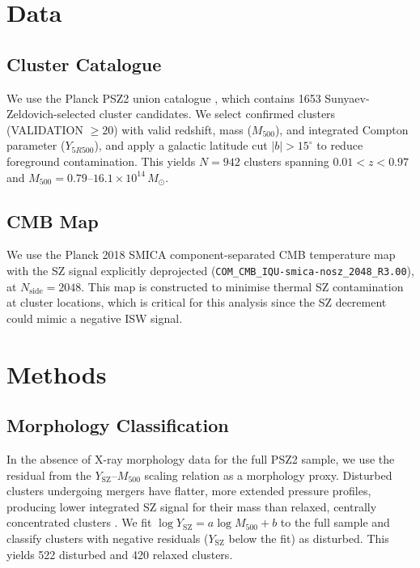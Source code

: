 \documentclass[twocolumn]{article}
\begin{document}
\section{Data}
\label{sec:data}

\subsection{Cluster Catalogue}

We use the Planck PSZ2 union catalogue
\citep{planckpsz2}, which contains 1653 Sunyaev-Zeldovich-selected
cluster candidates.
We select confirmed clusters (VALIDATION $\geq 20$) with valid
redshift, mass ($M_{500}$), and integrated Compton parameter
($Y_{5R500}$), and apply a galactic latitude cut $|b| > 15^\circ$
to reduce foreground contamination.
This yields $N = 942$ clusters spanning $0.01 < z < 0.97$ and
$M_{500} = 0.79$--$16.1 \times 10^{14}\,M_\odot$.

\subsection{CMB Map}

We use the Planck 2018 SMICA component-separated CMB temperature
map with the SZ signal explicitly deprojected
(\texttt{COM\_CMB\_IQU-smica-nosz\_2048\_R3.00}), at
$N_{\mathrm{side}} = 2048$.
This map is constructed to minimise thermal SZ contamination at
cluster locations, which is critical for this analysis since the
SZ decrement could mimic a negative ISW signal.

\section{Methods}
\label{sec:methods}

\subsection{Morphology Classification}

In the absence of X-ray morphology data for the full PSZ2 sample,
we use the residual from the $Y_{\mathrm{SZ}}$--$M_{500}$ scaling
relation as a morphology proxy.
Disturbed clusters undergoing mergers have flatter, more extended
pressure profiles, producing lower integrated SZ signal for their
mass than relaxed, centrally concentrated clusters
\citep{lovisari2017,planckesz2011}.
We fit $\log Y_{\mathrm{SZ}} = a \log M_{500} + b$ to the full
sample and classify clusters with negative residuals
($Y_{\mathrm{SZ}}$ below the fit) as disturbed.
This yields 522 disturbed and 420 relaxed clusters.
\end{document}
